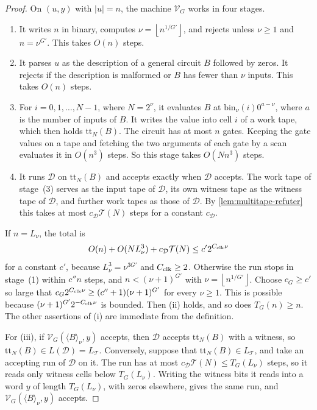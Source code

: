 \documentclass[11pt,letterpaper]{article}
\theoremstyle{definition}
\theoremstyle{remark}
\newcommand{\floor}[1]{\left\lfloor #1\right\rfloor}
\newcommand{\abs}[1]{\left|#1\right|}
\newcommand{\Tclk}{\mathcal T}
\begin{document}
\begin{proof}
On \((u,y)\) with \(\abs u=n\), the machine \(\mathcal V_G\) works in four
stages.
\begin{enumerate}[label=(\arabic*)]
\item It writes \(n\) in binary, computes \(\nu=\floor{n^{1/G'}}\), and
rejects unless \(\nu\ge1\) and \(n=\nu^{G'}\). This takes \(O(n)\)
steps.
\item It parses \(u\) as the description of a general circuit \(B\)
followed by zeros. It rejects if the description is malformed or \(B\)
has fewer than \(\nu\) inputs. This takes \(O(n)\) steps.
\item For \(i=0,1,\ldots,N-1\), where \(N=2^\nu\), it evaluates \(B\) at
\(\mathrm{bin}_\nu(i)0^{a-\nu}\), where \(a\) is the number of inputs of
\(B\). It writes the value into cell \(i\) of a work tape, which then
holds \(\mathrm{tt}_N(B)\). The circuit has at most \(n\) gates. Keeping
the gate values on a tape and fetching the two arguments of each gate by
a scan evaluates it in \(O(n^3)\) steps. So this stage takes
\(O(Nn^3)\) steps.
\item It runs \(\mathcal D\) on \(\mathrm{tt}_N(B)\) and accepts exactly
when \(\mathcal D\) accepts. The work tape of stage~(3) serves as the
input tape of \(\mathcal D\), its own witness tape as the witness tape
of \(\mathcal D\), and further work tapes as those of \(\mathcal D\). By
\cref{lem:multitape-refuter} this takes at most
\(c_{\mathcal D}\Tclk(N)\) steps for a constant \(c_{\mathcal D}\).
\end{enumerate}
If \(n=L_\nu\), the total is
\[
 O(n)+O(NL_\nu^3)+c_{\mathcal D}\Tclk(N)\le c'2^{C_{\rm clk}\nu}
\]
for a constant \(c'\), because \(L_\nu^3=\nu^{3G'}\) and
\(C_{\rm clk}\ge2\). Otherwise the run stops in stage~(1) within
\(c''n\) steps, and \(n<(\nu+1)^{G'}\) with \(\nu=\floor{n^{1/G'}}\).
Choose \(c_G\ge c'\) so large that
\(c_G2^{C_{\rm clk}\nu}\ge(c''+1)(\nu+1)^{G'}\) for every \(\nu\ge1\).
This is possible because \((\nu+1)^{G'}2^{-C_{\rm clk}\nu}\) is bounded.
Then (ii) holds, and so does \(T_G(n)\ge n\). The other assertions of (i)
are immediate from the definition.

For (iii), if \(\mathcal V_G(\langle B\rangle_\nu,y)\) accepts, then
\(\mathcal D\) accepts \(\mathrm{tt}_N(B)\) with a witness, so
\(\mathrm{tt}_N(B)\in L(\mathcal D)=L_{\Tclk}\). Conversely, suppose that
\(\mathrm{tt}_N(B)\in L_{\Tclk}\), and take an accepting run of
\(\mathcal D\) on it. The run has at most
\(c_{\mathcal D}\Tclk(N)\le T_G(L_\nu)\) steps, so it reads only witness
cells below \(T_G(L_\nu)\). Writing the witness bits it reads into a word
\(y\) of length \(T_G(L_\nu)\), with zeros elsewhere, gives the same run,
and \(\mathcal V_G(\langle B\rangle_\nu,y)\) accepts.
\end{proof}
\end{document}
